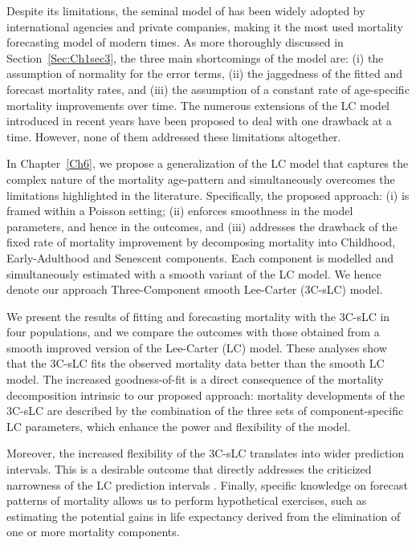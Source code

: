 \documentclass[Thesis]{subfiles}
\begin{document}
Despite its limitations, the seminal model of \cite{lee1992modeling} has been widely adopted by international agencies and private companies, making it the most used mortality forecasting model of modern times. As more thoroughly discussed in Section~\ref{Sec:Ch1sec3}, the three main shortcomings of the model are: (i) the assumption of normality for the error terms, (ii) the jaggedness of the fitted and forecast mortality rates, and (iii) the assumption of a constant rate of age-specific mortality improvements over time. The numerous extensions of the LC model introduced in recent years have been proposed to deal with one drawback at a time. However, none of them addressed these limitations altogether. 

In Chapter~\ref{Ch6}, we propose a generalization of the LC model that captures the complex nature of the mortality age-pattern and simultaneously overcomes the limitations highlighted in the literature. Specifically, the proposed approach: (i) is framed within a Poisson setting; (ii) enforces smoothness in the model parameters, and hence in the outcomes, and (iii) addresses the drawback of the fixed rate of mortality improvement by decomposing mortality into Childhood, Early-Adulthood and Senescent components. Each component is modelled and simultaneously estimated with a smooth variant of the LC model. We hence denote our approach Three-Component smooth Lee-Carter (3C-sLC) model. 

We present the results of fitting and forecasting mortality with the 3C-sLC in four populations, and we compare the outcomes with those obtained from a smooth improved version of the Lee-Carter (LC) model. These analyses show that the 3C-sLC fits the observed mortality data better than the smooth LC model. The increased goodness-of-fit is a direct consequence of the mortality decomposition intrinsic to our proposed approach: mortality developments of the 3C-sLC are described by the combination of the three sets of component-specific LC parameters, which enhance the power and flexibility of the model. 

Moreover, the increased flexibility of the 3C-sLC translates into wider prediction intervals. This is a desirable outcome that directly addresses the criticized narrowness of the LC prediction intervals \citep{alho1992comment}. Finally, specific knowledge on forecast patterns of mortality allows us to perform hypothetical exercises, such as estimating the potential gains in life expectancy derived from the elimination of one or more mortality components.
\end{document}

